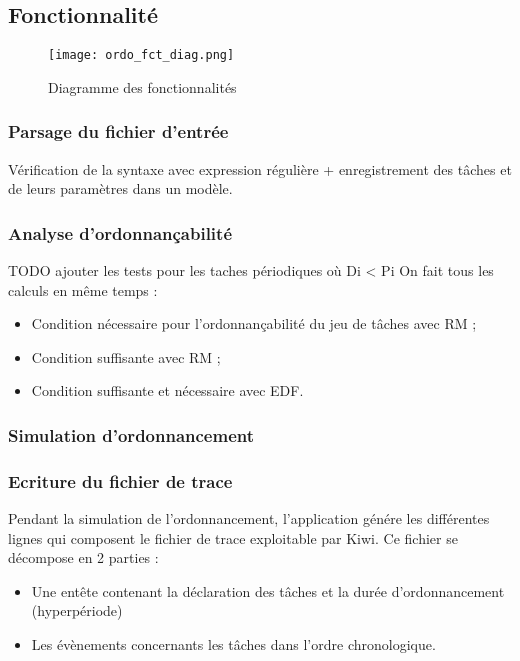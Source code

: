 		\subsection{Fonctionnalité}
			\begin{figure}
				\centering
				\texttt{[image: ordo\_fct\_diag.png]}
				\caption{Diagramme des fonctionnalités}
			\end{figure}
			\FloatBarrier
			
			\subsubsection{Parsage du fichier d'entrée}
				Vérification de la syntaxe avec expression régulière + enregistrement des tâches et de leurs paramètres dans un modèle.
			
			\subsubsection{Analyse d'ordonnançabilité}
				{\Huge TODO ajouter les tests pour les taches périodiques où Di < Pi}
				On fait tous les calculs en même temps :
				\begin{itemize}
					\item Condition nécessaire pour l'ordonnançabilité du jeu de tâches avec RM ;
					\item Condition suffisante avec RM ;
					\item Condition suffisante et nécessaire avec EDF.
				\end{itemize}
			
			\subsubsection{Simulation d'ordonnancement}
				
			
			\subsubsection{Ecriture du fichier de trace}
				Pendant la simulation de l'ordonnancement, l'application génére les différentes lignes qui composent le fichier de trace exploitable par Kiwi. Ce fichier se décompose en 2 parties :
					\begin{itemize}
						\item Une entête contenant la déclaration des tâches et la durée d'ordonnancement (hyperpériode)
						\item Les évènements concernants les tâches dans l'ordre chronologique.
					\end{itemize}
